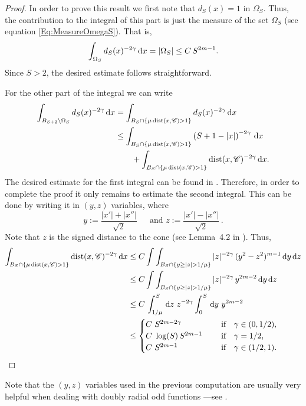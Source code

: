 \begin{proof}
In order to prove this result we first note that $d_S(x)=1$ in $\Omega_S$. Thus, the contribution to the integral of this part is just the measure of the set $\Omega_S$ (see equation \eqref{Eq:MeasureOmegaS}). That is,
$$
\int_{\Omega_S} d_S(x)^{-2\gamma} \,\mathrm{d} x = |\Omega_S| \leq C\,S^{2m-1}.
$$
Since $S>2$, the desired estimate follows straightforward.

For the other part of the integral we can write
\begin{align*}
\int_{B_{S+2}\setminus \Omega_S} d_S(x)^{-2\gamma} \,\mathrm{d} x &= \int_{B_{S}\cap \{\mu \operatorname{dist}(x,\mathscr{C})>1\}} d_S(x)^{-2\gamma} \,\mathrm{d} x \\
& \leq \int_{B_{S}\cap \{\mu \operatorname{dist}(x,\mathscr{C})>1\}} \left( S+1-|x| \right)^{-2\gamma} \,\mathrm{d} x \\
& \quad \quad + \int_{B_{S}\cap \{\mu \operatorname{dist}(x,\mathscr{C})>1\}} \operatorname{dist}(x,\mathscr{C})^{-2\gamma} \,\mathrm{d} x.
\end{align*}
The desired estimate for the first integral can be found in \cite{SavinValdinoci-EnergyEstimate}. Therefore, in order to complete the proof it only remains to estimate the second integral. This can be done by writing it in $(y,z)$ variables, where
$$
y := \dfrac{|x'|+|x''|}{\sqrt{2}} \, \quad \text{ and } z := \dfrac{|x'|-|x''|}{\sqrt{2}}\,.
$$
Note that $z$ is the signed distance to the cone (see Lemma~4.2 in \cite{CabreTerraI}). Thus,
\begin{align*}
\int_{B_{S}\cap \{\mu \dist(x,\ccal)>1\}} \dist(x,\ccal)^{-2\s} \d x &\leq C \int \int_{B_{S}\cap \{y\geq|z|>1/\mu\}} |z|^{-2\s} \, (y^2-z^2)^{m-1} \d y\d z \\
& \leq C \int \int_{B_{S}\cap \{y\geq|z|>1/\mu\}} |z|^{-2\s} \, y^{2m-2} \d y\d z \\
& \leq C\, \int_{1/\mu}^S \d z   \ z^{-2\s}\int_0^S \d y\  y^{2m-2} \\
& \leq \begin{cases}
C \ S^{2m-2\s}\ \ \ \ &\textrm{if } \ \ \s\in(0,1/2),\\
C\ \log(S)\,S^{2m-1}\ \ \ \ &\textrm{if } \ \ \s=1/2,\\
C \ S^{2m-1}\ \ \ \ &\textrm{if } \ \ \s\in(1/2,1).\\
\end{cases}
\end{align*}
\end{proof}

Note that the $(y,z)$ variables used in the previous computation are usually very helpful when dealing with doubly radial odd functions ---see \cite{CabreTerraI, CabreTerraII, Cabre-Saddle, Cinti-Saddle,Cinti-Saddle2, Felipe-Sanz-Perela:SaddleFractional}.

